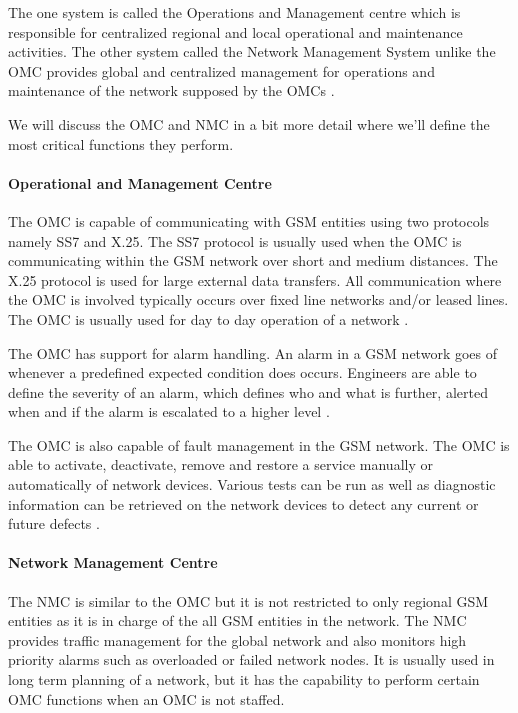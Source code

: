 The one system is called the Operations and Management centre which is responsible for centralized regional and local operational and maintenance activities. The other system called the Network Management System unlike the OMC provides global and centralized management for operations and maintenance of the network supposed by the OMCs \cite{GSMSysEngin}.

We will discuss the OMC and NMC in a bit more detail where we'll define the most critical functions they perform.

\paragraph{Operational and Management Centre}
The OMC is capable of communicating with GSM entities using two protocols namely SS7 and X.25. The SS7 protocol is usually used when the OMC is communicating within the GSM network over short and medium distances. The X.25 protocol is used for large external data transfers. All communication where the OMC is involved typically occurs over fixed line networks and/or leased lines. The OMC is usually used for day to day operation of a network \cite{GSMSysEngin}.

The OMC has support for alarm handling. An alarm in a GSM network goes of whenever a predefined expected condition does occurs. Engineers are able to define the severity of an alarm, which defines who and what is further, alerted when and if the alarm is escalated to a higher level \cite{GSMSysEngin}.

The OMC is also capable of fault management in the GSM network. The OMC is able to activate, deactivate, remove and restore a service manually or automatically of network devices\cite{GSM92}. Various tests can be run as well as diagnostic information can be retrieved on the network devices to detect any current or future defects \cite{GSMSysEngin}.

\paragraph{Network Management Centre}
The NMC is similar to the OMC but it is not restricted to only regional GSM entities as it is in charge of the all GSM entities in the network. The NMC provides traffic management for the global network and also monitors high priority alarms such as overloaded or failed network nodes. It is usually used in long term planning of a network, but it has the capability to perform certain OMC functions when an OMC is not staffed. 

